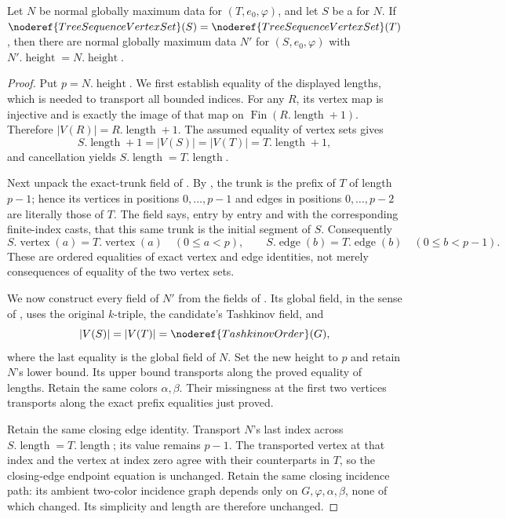 \begin{helper}
Let $N$ be normal globally maximum data for $(T,e_0,\varphi)$, and let
$S$ be a  for $N$.  If
$\noderef{TreeSequenceVertexSet}(S)=
\noderef{TreeSequenceVertexSet}(T)$, then there are normal globally maximum
data $N'$ for $(S,e_0,\varphi)$ with
$N'.\operatorname{height}=N.\operatorname{height}$.
\end{helper}
\begin{proof}
Put $p=N.\operatorname{height}$.  We first establish equality of the
displayed lengths, which is needed to transport all bounded indices.
For any  $R$, its vertex map is injective and
 is exactly the image of that map on
$\operatorname{Fin}(R.\operatorname{length}+1)$.  Therefore
$|V(R)|=R.\operatorname{length}+1$.  The assumed equality of vertex sets
gives
\[
 S.\operatorname{length}+1=|V(S)|=|V(T)|
 =T.\operatorname{length}+1,
\]
and cancellation yields $S.\operatorname{length}=T.\operatorname{length}$.

Next unpack the exact-trunk field of
.  By
, the trunk is the prefix of $T$ of length
$p-1$; hence its vertices in positions $0,\ldots,p-1$ and edges in
positions $0,\ldots,p-2$ are literally those of $T$.  The
 field says, entry by entry and with
the corresponding finite-index casts, that this same trunk is the initial
segment of $S$.  Consequently
\[
 S.\operatorname{vertex}(a)=T.\operatorname{vertex}(a)
 \quad(0\le a<p),
 \qquad
 S.\operatorname{edge}(b)=T.\operatorname{edge}(b)
 \quad(0\le b<p-1).
\]
These are ordered equalities of exact vertex and edge identities, not merely
consequences of equality of the two vertex sets.

We now construct every field of $N'$ from the fields of
.  Its global field, in the sense of
, uses the original $k$-triple, the
candidate's Tashkinov field, and
\[
 |V(S)|=|V(T)|=\noderef{TashkinovOrder}(G),
\]
where the last equality is the global field of $N$.  Set the new height to
$p$ and retain $N$'s lower bound.  Its upper bound transports along the
proved equality of lengths.  Retain the same colors $\alpha,\beta$.
Their missingness at the first two vertices transports along the exact
prefix equalities just proved.

Retain the same closing edge identity.  Transport $N$'s last index across
$S.\operatorname{length}=T.\operatorname{length}$; its value remains
$p-1$.  The transported vertex at that index and the vertex at index zero
agree with their counterparts in $T$, so the closing-edge endpoint equation
is unchanged.  Retain the same closing incidence path: its ambient
two-color incidence graph depends only on $G,\varphi,\alpha,\beta$, none of
which changed.  Its simplicity and length are therefore unchanged.


\end{proof}
